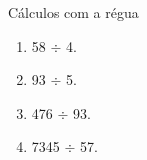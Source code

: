 \begin{task}{Cálculos com a régua}
\begin{enumerate}
\item 58 $\div$ 4. %
\item 93 $\div$ 5.%
\item 476 $\div$ 93.%
\item 7345 $\div$ 57.%
\end{enumerate}
\end{task}

